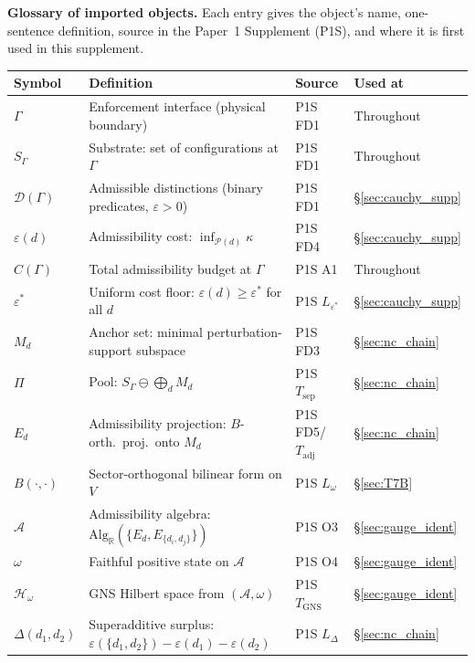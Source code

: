\documentclass[11pt]{article}
\theoremstyle{definition}
\newcommand{\eps}{\varepsilon}
\begin{document}
\medskip
\medskip\noindent\textbf{Glossary of imported objects.}  Each entry gives the object's name, one-sentence definition, source in the Paper~1 Supplement (P1S), and where it is first used in this supplement.

\smallskip
\begin{center}\small
\renewcommand{\arraystretch}{1.15}
\begin{tabular}{@{}lp{5.8cm}ll@{}}
\toprule
\textbf{Symbol} & \textbf{Definition} & \textbf{Source} & \textbf{Used at} \\
\midrule
$\Gamma$ & Enforcement interface (physical boundary) & P1S FD1 & Throughout \\
$S_\Gamma$ & Substrate: set of configurations at $\Gamma$ & P1S FD1 & Throughout \\
$\mathcal{D}(\Gamma)$ & Admissible distinctions (binary predicates, $\eps > 0$) & P1S FD1 & \S\ref{sec:cauchy_supp} \\
$\eps(d)$ & Admissibility cost: $\inf_{\mathcal{P}(d)} \kappa$ & P1S FD4 & \S\ref{sec:cauchy_supp} \\
$C(\Gamma)$ & Total admissibility budget at $\Gamma$ & P1S A1 & Throughout \\
$\eps^*$ & Uniform cost floor: $\eps(d) \ge \eps^*$ for all $d$ & P1S $L_{\eps^*}$ & \S\ref{sec:cauchy_supp} \\
$M_d$ & Anchor set: minimal perturbation-support subspace & P1S FD3 & \S\ref{sec:nc_chain} \\
$\Pi$ & Pool: $S_\Gamma \ominus \bigoplus_d M_d$ & P1S $T_{\mathrm{sep}}$ & \S\ref{sec:nc_chain} \\
$E_d$ & Admissibility projection: $B$-orth.\ proj.\ onto $M_d$ & P1S FD5/$T_{\mathrm{adj}}$ & \S\ref{sec:nc_chain} \\
$B(\cdot,\cdot)$ & Sector-orthogonal bilinear form on $V$ & P1S $L_\omega$ & \S\ref{sec:T7B} \\
$\mathcal{A}$ & Admissibility algebra: $\mathrm{Alg}_\mathbb{R}(\{E_d, E_{\{d_i,d_j\}}\})$ & P1S O3 & \S\ref{sec:gauge_ident} \\
$\omega$ & Faithful positive state on $\mathcal{A}$ & P1S O4 & \S\ref{sec:gauge_ident} \\
$\mathcal{H}_\omega$ & GNS Hilbert space from $(\mathcal{A}, \omega)$ & P1S $T_{\mathrm{GNS}}$ & \S\ref{sec:gauge_ident} \\
$\Delta(d_1,d_2)$ & Superadditive surplus: $\eps(\{d_1,d_2\}) - \eps(d_1) - \eps(d_2)$ & P1S $L_\Delta$ & \S\ref{sec:nc_chain} \\
\bottomrule
\end{tabular}
\end{center}
\end{document}
